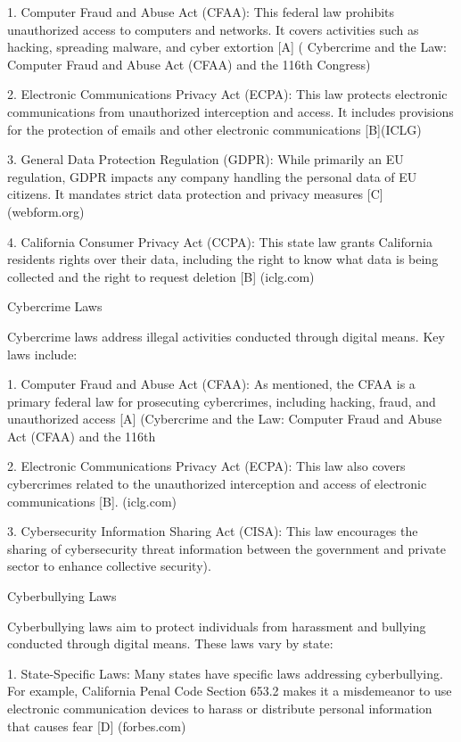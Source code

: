 \documentclass[12pt,letterpaper]{article}
\begin{document}
1. Computer Fraud and Abuse Act (CFAA): This federal law prohibits unauthorized access to computers and networks. It covers activities such as hacking, spreading malware, and cyber extortion [A] ( Cybercrime and the Law: Computer Fraud and
Abuse Act (CFAA) and the 116th Congress)

2. Electronic Communications Privacy Act (ECPA): This law protects electronic communications from unauthorized interception and access. It includes provisions for the protection of emails and other electronic communications [B](ICLG)


3. General Data Protection Regulation (GDPR): While primarily an EU regulation, GDPR impacts any company handling the personal data of EU citizens. It mandates strict data protection and privacy measures [C](webform.org)


4. California Consumer Privacy Act (CCPA): This state law grants California residents rights over their data, including the right to know what data is being collected and the right to request deletion [B] (iclg.com)

 
Cybercrime Laws

Cybercrime laws address illegal activities conducted through digital means. Key laws include:

1. Computer Fraud and Abuse Act (CFAA): As mentioned, the CFAA is a primary federal law for prosecuting cybercrimes, including hacking, fraud, and unauthorized access [A] (Cybercrime and the Law: Computer Fraud and Abuse Act (CFAA) and the 116th

2. Electronic Communications Privacy Act (ECPA): This law also covers cybercrimes related to the unauthorized interception and access of electronic communications 
[B]. (iclg.com)

3. Cybersecurity Information Sharing Act (CISA): This law encourages the sharing of cybersecurity threat information between the government and private sector to enhance collective security).


Cyberbullying Laws

Cyberbullying laws aim to protect individuals from harassment and bullying conducted through digital means. These laws vary by state:

1. State-Specific Laws: Many states have specific laws addressing cyberbullying. For example, California Penal Code Section 653.2 makes it a misdemeanor to use electronic communication devices to harass or distribute personal information that causes fear [D] (forbes.com)
\end{document}

